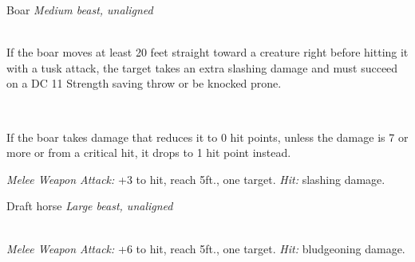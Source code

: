 \documentclass[10pt,twoside,twocolumn,openany]{book}
\begin{document}
\begin{monsterboxnobg}{Boar}
	\textit{Medium beast, unaligned}\\
	\hline
	\basics[
		armorclass	= 11,
		hitpoints 		= \dice{2d8 + 2},
		speed		= {40 ft.}
	]
	\hline
	\stats[
		STR	= \stat{13},
		DEX	= \stat{11},
		CON	= \stat{12},
		INT	= \stat{2},
		WIS	= \stat{9},
		CHA	= \stat{5}
	]
	\hline
	\details[
		skills			= {},
		senses 		= {passive Perception 9},
		languages		= {-},
		challenge 		= 1/4
	]
	\hline \\[1mm]
	\begin{monsteraction}[Charge]
		If the boar moves at least 20 feet straight toward a creature right before hitting it with a tusk attack, the target takes an extra  slashing damage and must succeed on a DC 11 Strength saving throw or be knocked prone.
	\end{monsteraction}\\
	\begin{monsteraction}
		If the boar takes damage that reduces it to 0 hit points, unless the damage is 7 or more or from a critical hit, it drops to 1 hit point instead.
	\end{monsteraction}
	\begin{monsteraction}[Tusk]
		\textit{Melee Weapon Attack:} +3 to hit, reach 5ft., one target. \textit{Hit:}  slashing damage.
	\end{monsteraction}
\end{monsterboxnobg}

\begin{monsterboxnobg}{Draft horse}
	\textit{Large beast, unaligned}\\
	\hline
	\basics[
		armorclass	= 10,
		hitpoints 		= \dice{3d10 + 3},
		speed		= {40 ft.}
	]
	\hline
	\stats[
		STR	= \stat{18},
		DEX	= \stat{10},
		CON	= \stat{12},
		INT	= \stat{2},
		WIS	= \stat{11},
		CHA	= \stat{7}
	]
	\hline
	\details[
		skills			= {},
		senses		= {passive Perception 10},
		languages		= {-},
		challenge		= 1/4
	]
	\hline \\[1mm]
	\begin{monsteraction}[Hooves]
		\textit{Melee Weapon Attack:} +6 to hit, reach 5ft., one target. \textit{Hit:}  bludgeoning damage.
	\end{monsteraction}
\end{monsterboxnobg}
\end{document}

